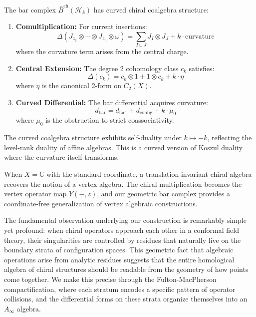 \begin{theorem}\label{thm:heis-bar-coalg}
The bar complex $\bar{B}^{\text{ch}}(\mathcal{H}_k)$ has curved chiral coalgebra structure:
\begin{enumerate}
\item \textbf{Comultiplication:} For current insertions:
\[
\Delta(J_{z_1} \otimes \cdots \otimes J_{z_n} \otimes \omega) = 
\sum_{I \sqcup J} J_I \otimes J_J + k \cdot \text{curvature}
\]
where the curvature term arises from the central charge.

\item \textbf{Central Extension:} The degree 2 cohomology class $c_k$ satisfies:
\[
\Delta(c_k) = c_k \otimes 1 + 1 \otimes c_k + k \cdot \eta
\]
where $\eta$ is the canonical 2-form on $C_2(X)$.

\item \textbf{Curved Differential:} The bar differential acquires curvature:
\[
 d_{\text{bar}} = d_{\text{fact}} + d_{\text{config}} + k \cdot \mu_0
\]
where $\mu_0$ is the obstruction to strict coassociativity.
\end{enumerate}
\end{theorem}

\begin{remark}
The curved coalgebra structure exhibits self-duality under $k \mapsto -k$, reflecting the 
level-rank duality of affine algebras. This is a curved version of Koszul duality where 
the curvature itself transforms.
\end{remark}

\begin{remark}
When $X = \mathbb{C}$ with the standard coordinate, a translation-invariant chiral algebra recovers the notion of a vertex algebra. The chiral multiplication becomes the vertex operator map $Y(-, z)$, and our geometric bar complex provides a coordinate-free generalization of vertex algebraic constructions.
\end{remark}

The fundamental observation underlying our construction is remarkably simple yet profound: when chiral operators approach each other in a conformal field theory, their singularities are controlled by residues that naturally live on the boundary strata of configuration spaces. This geometric fact that algebraic operations arise from analytic residues suggests that the entire homological algebra of chiral structures should be readable from the geometry of how points come together. We make this precise through the Fulton-MacPherson compactification, where each stratum encodes a specific pattern of operator collisions, and the differential forms on these strata organize themselves into an $A_\infty$ algebra.

